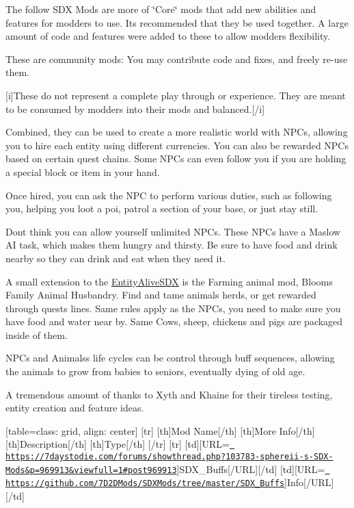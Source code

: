 The follow S\+DX Mods are more of \char`\"{}\+Core\char`\"{} mods that add new abilities and features for modders to use. It\textquotesingle{}s recommended that they be used together. A large amount of code and features were added to these to allow modders flexibility.

These are community mods\+: You may contribute code and fixes, and freely re-\/use them.

\mbox{[}i\mbox{]}These do not represent a complete play through or experience. They are meant to be consumed by modders into their mods and balanced.\mbox{[}/i\mbox{]}

Combined, they can be used to create a more realistic world with N\+P\+Cs, allowing you to hire each entity using different currencies. You can also be rewarded N\+P\+Cs based on certain quest chains. Some N\+P\+Cs can even follow you if you are holding a special block or item in your hand.

Once hired, you can ask the N\+PC to perform various duties, such as following you, helping you loot a poi, patrol a section of your base, or just stay still.

Don\textquotesingle{}t think you can allow yourself unlimited N\+P\+Cs. These N\+P\+Cs have a Maslow AI task, which makes them hungry and thirsty. Be sure to have food and drink nearby so they can drink and eat when they need it.

A small extension to the \mbox{\hyperlink{class_entity_alive_s_d_x}{Entity\+Alive\+S\+DX}} is the Farming animal mod, Bloom\textquotesingle{}s Family Animal Husbandry. Find and tame animals herds, or get rewarded through quests lines. Same rules apply as the N\+P\+Cs, you need to make sure you have food and water near by. Same Cows, sheep, chickens and pigs are packaged inside of them.

N\+P\+Cs and Animals\textquotesingle{}s life cycles can be control through buff sequences, allowing the animals to grow from babies to seniors, eventually dying of old age.

A tremendous amount of thanks to Xyth and Khaine for their tireless testing, entity creation and feature ideas.

\mbox{[}table=class\+: grid, align\+: center\mbox{]} \mbox{[}tr\mbox{]} \mbox{[}th\mbox{]}Mod Name\mbox{[}/th\mbox{]} \mbox{[}th\mbox{]}More Info\mbox{[}/th\mbox{]} \mbox{[}th\mbox{]}Description\mbox{[}/th\mbox{]} \mbox{[}th\mbox{]}Type\mbox{[}/th\mbox{]} \mbox{[}/tr\mbox{]} \mbox{[}tr\mbox{]} \mbox{[}td\mbox{]}\mbox{[}U\+RL=\href{https://7daystodie.com/forums/showthread.php?103783-sphereii-s-SDX-Mods&p=969913&viewfull=1\#post969913}{\texttt{ https\+://7daystodie.\+com/forums/showthread.\+php?103783-\/sphereii-\/s-\/\+S\+D\+X-\/\+Mods\&p=969913\&viewfull=1\#post969913}}\mbox{]}S\+D\+X\+\_\+\+Buffs\mbox{[}/\+U\+RL\mbox{]}\mbox{[}/td\mbox{]} \mbox{[}td\mbox{]}\mbox{[}U\+RL=\href{https://github.com/7D2DMods/SDXMods/tree/master/SDX_Buffs}{\texttt{ https\+://github.\+com/7\+D2\+D\+Mods/\+S\+D\+X\+Mods/tree/master/\+S\+D\+X\+\_\+\+Buffs}}\mbox{]}Info\mbox{[}/\+U\+RL\mbox{]}\mbox{[}/td\mbox{]}

